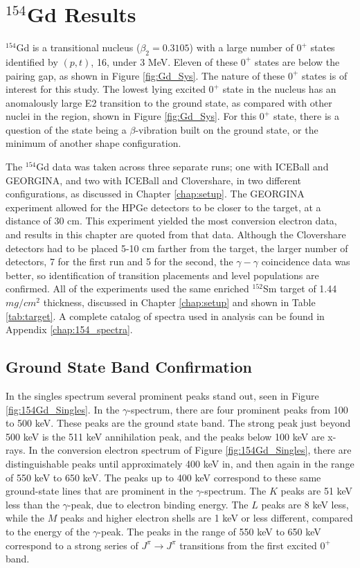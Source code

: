 \chapter{$^{154}$Gd Results}
\label{chap:154Gd}

$^{154}$Gd is a transitional nucleus ($\beta_2=0.3105$) with a large number of $0^+$ states identified by $(p,t)$, 16, under 3 MeV. Eleven of these $0^+$ states are below the pairing gap, as shown in Figure \ref{fig:Gd_Sys}. The nature of these $0^+$ states is of interest for this study. The lowest lying excited $0^+$ state in the nucleus has an anomalously large E2 transition to the ground state, as compared with other nuclei in the region, shown in Figure \ref{fig:Gd_Sys}. For this $0^+$ state, there is a question of the state being a $\beta$-vibration built on the ground state, or the minimum of another shape configuration.

\afterpage{\clearpage}

The $^{154}$Gd data was taken across three separate runs; one with ICEBall and GEORGINA, and two with ICEBall and Clovershare, in two different configurations, as discussed in Chapter \ref{chap:setup}. The GEORGINA experiment allowed for the HPGe detectors to be closer to the target, at a distance of 30 cm. This experiment yielded the most conversion electron data, and results in this chapter are quoted from that data. Although the Clovershare detectors had to be placed 5-10 cm farther from the target, the larger number of detectors, 7 for the first run and 5 for the second, the $\gamma-\gamma$ coincidence data was better, so identification of transition placements and level populations are confirmed. All of the experiments used the same enriched $^{152}$Sm target of 1.44 $mg/cm^2$ thickness, discussed in Chapter \ref{chap:setup} and shown in Table \ref{tab:target}. A complete catalog of spectra used in analysis can be found in Appendix \ref{chap:154_spectra}.

\section{Ground State Band Confirmation}
\label{sec:154GS_Confirm}

In the singles spectrum several prominent peaks stand out, seen in Figure \ref{fig:154Gd_Singles}. In the $\gamma$-spectrum, there are four prominent peaks from 100 to 500 keV. These peaks are the ground state band. The strong peak just beyond 500 keV is the 511 keV annihilation peak, and the peaks below 100 keV are x-rays. In the conversion electron spectrum of Figure \ref{fig:154Gd_Singles}, there are distinguishable peaks until approximately 400 keV in, and then again in the range of 550 keV to 650 keV. The peaks up to 400 keV correspond to these same ground-state lines that are prominent in the $\gamma$-spectrum. The $K$ peaks are 51 keV less than the $\gamma$-peak, due to electron binding energy. The $L$ peaks are 8 keV less, while the $M$ peaks and higher electron shells are 1 keV or less different, compared to the energy of the $\gamma$-peak. The peaks in the range of 550 keV to 650 keV correspond to a strong series of $J^{\pi}\rightarrow J^{\pi}$ transitions from the first excited $0^+$ band.

